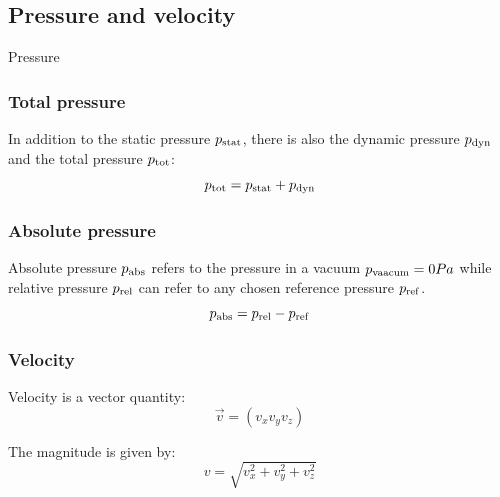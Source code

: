 \documentclass{article}
\begin{document}
\begin{multicols}{2}
\vfill
\columnbreak

\subsection{Pressure and velocity}
\begin{theorybox}{Pressure}
    \subsubsection{Total pressure}
    In addition to the static pressure $p_{\rm stat}$, there is also the
    dynamic pressure $p_{\rm dyn}$ and the total pressure $p_{\rm tot}$:
    \begin{equation}
        p_{\rm tot} = p_{\rm stat} + p_{\rm dyn}
    \end{equation}

    \subsubsection{Absolute pressure}
    Absolute pressure $p_{\rm abs}$ refers to the pressure in a vacuum
    $p_{\rm vaacum}=0 Pa$ while relative pressure $p_{\rm rel}$ can refer to
    any chosen reference pressure $p_{\rm ref}$.
    \begin{equation}
        p_{\rm abs} = p_{\rm rel} - p_{\rm ref}
    \end{equation}

    \subsubsection{Velocity}
    Velocity is a vector quantity:
    \begin{equation}
        \vec{v} = \left(v_x v_y v_z\right)
    \end{equation}

    The magnitude is given by:
    \begin{equation}
        v = \sqrt{v_x^2 + v_y^2 + v_z^2}
    \end{equation}
\end{theorybox}


\end{multicols}
\end{document}
